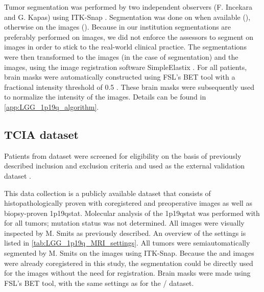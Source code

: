 Tumor segmentation was performed by two independent observers (F. Incekara and G. Kapas) using ITK-Snap \autocite{yushkevich2006user}.
Segmentation was done on  when available (), otherwise on the  images ().
Because in our institution  segmentations are preferably performed on  images, we did not enforce the assessors to segment on  images in order to stick to the real-world clinical practice.
The segmentations were then transformed to the  images (in the case of  segmentation) and the  images, using the image registration software SimpleElastix \autocite{marstal2016simpleelastix}.
For all patients, brain masks were automatically constructed using FSL's BET tool with a fractional intensity threshold of \num{0.5} \autocite{smith2002fast}.
These brain masks were subsequently used to normalize the intensity of the  images.
Details can be found in \cref{app:LGG_1p19q_algorithm}.

\subsection{\acrlong{TCIA} dataset}

Patients from   dataset were screened for eligibility on the basis of previously described inclusion and exclusion criteria and used as the external validation dataset \autocite{akkus2017predicting, clark2013cancer, bradley2017radiology}.

This data collection is a publicly available dataset that consists of histopathologically proven  with coregistered  and  preoperative  images as well as biopsy-proven \acl{1p19qstat}.
Molecular analysis of the \acl{1p19qstat} was performed with  for all tumors;  mutation status was not determined.
All  images were visually inspected by M. Smits as previously described.
An overview of the  settings is listed in \cref{tab:LGG_1p19q_MRI_settings}.
All tumors were semiautomatically segmented by M. Smits on the  images using ITK-Snap.
Because the  and  images were already coregistered in this study, the segmentation could be directly used for the  images without the need for registration.
Brain masks were made using FSL's BET tool, with the same settings as for the / dataset.

